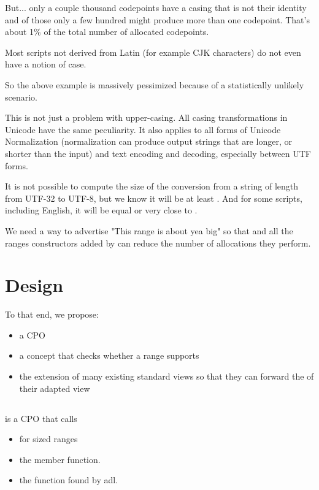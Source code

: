 \documentclass{wg21}
\begin{document}
But... only a couple thousand codepoints have a casing that is not their identity and of those only a few hundred might produce more than
one codepoint. That's about 1\% of the total number of allocated codepoints.

Most scripts not derived from Latin (for example CJK characters) do not even have a notion of case.

So the above example is massively pessimized because of a statistically unlikely scenario.

This is not just a problem with upper-casing. All casing transformations in Unicode have the same peculiarity.
It also applies to all forms of Unicode Normalization (normalization can produce output strings that are longer, or shorter than the input)
and text encoding and decoding, especially between UTF forms.

It is not possible to compute the size of the conversion from a string of length  from UTF-32 to UTF-8, but we know it will be at least .
And for some scripts, including English, it will be equal or very close to .


We need a way to advertise "This range is about yea big" so that  and all the ranges constructors added by 
can reduce the number of allocations they perform.

\section{Design}

To that end, we propose:

\begin{itemize}
\item a  CPO
\item a  concept that checks whether a range supports 
\item the extension of many existing standard views so that they can forward the  of their adapted view
\end{itemize}

\subsection{}

 is a CPO that calls
\begin{itemize}
    \item {} for sized ranges
    \item the  member function.
    \item the  function found by adl.
\end{itemize}
\end{document}

